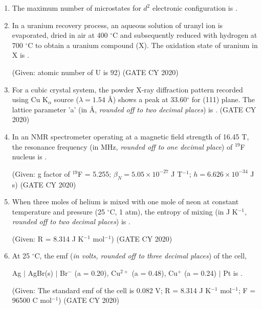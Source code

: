 \documentclass[12pt]{article}
\begin{document}
\begin{enumerate}
\item The maximum number of microstates for $d^2$ electronic configuration is \underline{\hspace{2cm}}.


\item In a uranium recovery process, an aqueous solution of uranyl ion is evaporated, dried in air at 400 $^\circ$C and subsequently reduced with hydrogen at 700 $^\circ$C to obtain a uranium compound (X). The oxidation state of uranium in X is \underline{\hspace{2cm}}.

(Given: atomic number of U is 92)
\hfill (GATE CY 2020)

\item For a cubic crystal system, the powder X-ray diffraction pattern recorded using Cu K$_\alpha$ source ($\lambda = 1.54$ \AA) shows a peak at 33.60$^\circ$ for (111) plane. The lattice parameter 'a' (in \AA, \textit{rounded off to two decimal places}) is \underline{\hspace{2cm}}.
\hfill (GATE CY 2020)

\item In an NMR spectrometer operating at a magnetic field strength of 16.45 T, the resonance frequency (in MHz, \textit{rounded off to one decimal place}) of $^{19}$F nucleus is \underline{\hspace{2cm}}.

(Given: g factor of $^{19}$F = 5.255; $\beta_N = 5.05 \times 10^{-27}$ J T$^{-1}$; $h = 6.626 \times 10^{-34}$ J s)
\hfill (GATE CY 2020)

\item When three moles of helium is mixed with one mole of neon at constant temperature and pressure (25 $^\circ$C, 1 atm), the entropy of mixing (in J K$^{-1}$, \textit{rounded off to two decimal places}) is \underline{\hspace{2cm}}.

(Given: R = 8.314 J K$^{-1}$ mol$^{-1}$)
\hfill (GATE CY 2020)

\item At 25 $^\circ$C, the emf (\textit{in volts, rounded off to three decimal places}) of the cell,

Ag $|$ AgBr(s) $|$ Br$^-$ (a = 0.20), Cu$^{2+}$ (a = 0.48), Cu$^+$ (a = 0.24) $|$ Pt is \underline{\hspace{2cm}}.

(Given: The standard emf of the cell is 0.082 V; R = 8.314 J K$^{-1}$ mol$^{-1}$; F = 96500 C mol$^{-1}$)
\hfill (GATE CY 2020)


\end{enumerate}
\end{document}
